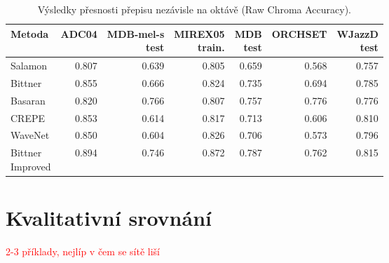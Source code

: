 \begin{table}[h!]
\centering

\begin{tabular}{lrrrrrr}
\toprule
              Metoda & ADC04 & \shortstack[r]{MDB-mel-s \\ test} & \shortstack[r]{MIREX05\\train.} & \shortstack[r]{MDB\\test} & ORCHSET & \shortstack[r]{WJazzD\\test} \\
\midrule
        Salamon & 0.807 &                 0.639 &          0.805 &         0.659 &   0.568 &       0.757 \\
        Bittner & 0.855 &                 0.666 &          0.824 &         0.735 &   0.694 &       0.785 \\
        Basaran & 0.820 &                 0.766 &          0.807 &         0.757 &   0.776 &       0.776 \\
          CREPE & 0.853 &                 0.614 &          0.817 &         0.713 &   0.606 &       0.810 \\
        WaveNet & 0.850 &                 0.604 &          0.826 &         0.706 &   0.573 &       0.796 \\
 \shortstack[r]{Bittner\\Improved}   & 0.894 &                 0.746 &          0.872 &         0.787 &   0.762 &       0.815 \\
\bottomrule
\end{tabular}

\caption{Výsledky přesnosti přepisu nezávisle na oktávě (Raw Chroma Accuracy).}\label{tab:vysledky_RCA}
\end{table}

\section{Kvalitativní srovnání}

\textcolor{red}{2-3 příklady, nejlíp v čem se sítě liší}